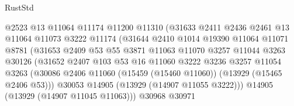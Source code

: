 \begin{lexlean}{RustStd}
\begin{coremodule}
                                  @2523
                                  @13
                                  @11064
                                  @11174
                                  @11200
                                  @11310
                                  (@31633
                                    @2411
                                    @2436
                                    @2461
                                    @13
                                    @11064
                                    @11073
                                    @3222
                                    @11174
                                    (@31644
                                      @2410
                                      @1014
                                      @19390
                                      @11064
                                      @11071
                                      @8781
                                      (@31653
                                        @2409
                                        @53
                                        @55
                                        @3871
                                        @11063
                                        @11070
                                        @3257
                                        @11044
                                        @3263
                                        @30126
                                        (@31652
                                          @2407
                                          @103
                                          @53
                                          @16
                                          @11060
                                          @3222
                                          @3236
                                          @3257
                                          @11054
                                          @3263
                                          (@30086
                                            @2406
                                            @11060
                                            (@15459 (@15460 @11060))
                                            (@13929 (@15465 @2406 @53)))
                                          @30053
                                          @14905
                                          (@13929 (@14907 @11055 @3222)))
                                        @14905
                                        (@13929 (@14907 @11045 @11063)))
                                      @30968
                                      @30971

\end{coremodule}
\end{lexlean}
